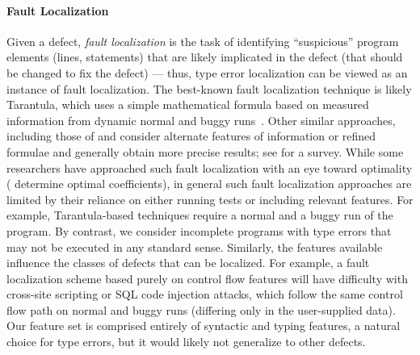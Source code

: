 \paragraph{Fault Localization}
%
Given a defect, \emph{fault localization} is the task of identifying
``suspicious'' program elements (\eg lines, statements) that are likely
implicated in the defect (\ie that should be changed to fix the defect)
%
--- thus, type error localization can be viewed as an instance of fault
localization.
%
The best-known fault localization technique is likely Tarantula, which
uses a simple mathematical formula based on measured information from
dynamic normal and buggy runs~\citep{Jones2002-us}.
%
Other similar approaches, including those of \citet{Chen2002-qz} and
\citet{Abreu2006-fn,Abreu2007-mu} consider alternate features of
information or refined formulae and generally obtain more precise
results; see \citet{Wong2009-pd} for a survey.
%
While some researchers have approached such fault localization with an
eye toward optimality (\eg \citet{Yoo2013-rw} determine optimal
coefficients), in general such fault localization approaches are limited
by their reliance on either running tests or including relevant
features.
%
For example, Tarantula-based techniques require a normal and a buggy run
of the program.
%
By contrast, we consider incomplete programs with type errors that may
not be executed in any standard sense.
%
Similarly, the features available influence the classes of defects that
can be localized.
%
For example, a fault localization scheme based purely on control flow features
will have difficulty with cross-site scripting or SQL code injection
attacks, which follow the same control flow path on normal and buggy
runs (differing only in the user-supplied data).
%
Our feature set is comprised entirely of syntactic and typing features,
a natural choice for type errors, but it would likely not
generalize to other defects.





